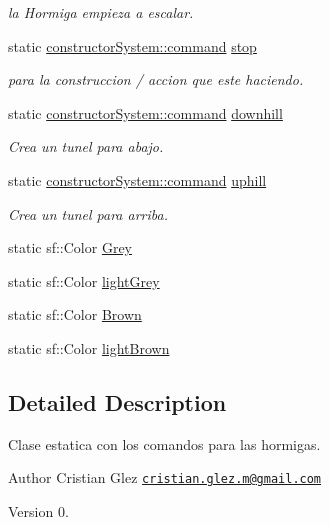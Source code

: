 \begin{DoxyCompactItemize}
\begin{DoxyCompactList}\small\item\em la Hormiga empieza a escalar. \end{DoxyCompactList}\item 
static \hyperlink{classant_1_1constructor_system_a0977052dc8865f8e79ae03b4f3e18d8a}{constructor\+System\+::command} \hyperlink{classant_1_1_constructions_a3bc1283137ad6344af1f966256bdfe89}{stop}
\begin{DoxyCompactList}\small\item\em para la construccion / accion que este haciendo. \end{DoxyCompactList}\item 
static \hyperlink{classant_1_1constructor_system_a0977052dc8865f8e79ae03b4f3e18d8a}{constructor\+System\+::command} \hyperlink{classant_1_1_constructions_a763c8e75cc3802706c8bf329879a6553}{downhill}
\begin{DoxyCompactList}\small\item\em Crea un tunel para abajo. \end{DoxyCompactList}\item 
static \hyperlink{classant_1_1constructor_system_a0977052dc8865f8e79ae03b4f3e18d8a}{constructor\+System\+::command} \hyperlink{classant_1_1_constructions_a9c986c906a803a6b777ad383060699d6}{uphill}
\begin{DoxyCompactList}\small\item\em Crea un tunel para arriba. \end{DoxyCompactList}\item 
static sf\+::\+Color \hyperlink{classant_1_1_constructions_a7944525a68c021ffe9e7c7afbd2d8f9a}{Grey}
\item 
static sf\+::\+Color \hyperlink{classant_1_1_constructions_a694ef338349eee7bbd42294e467f4bad}{light\+Grey}
\item 
static sf\+::\+Color \hyperlink{classant_1_1_constructions_a6b4b56037615b211e944a4dc6533aeb1}{Brown}
\item 
static sf\+::\+Color \hyperlink{classant_1_1_constructions_a78fa43047a5a82a3d1e9ab276c183181}{light\+Brown}
\end{DoxyCompactItemize}


\subsection{Detailed Description}
Clase estatica con los comandos para las hormigas. 

\begin{DoxyAuthor}{Author}
Cristian Glez \href{mailto:cristian.glez.m@gmail.com}{\tt cristian.\+glez.\+m@gmail.\+com} 
\end{DoxyAuthor}
\begin{DoxyVersion}{Version}
0. 
\end{DoxyVersion}


